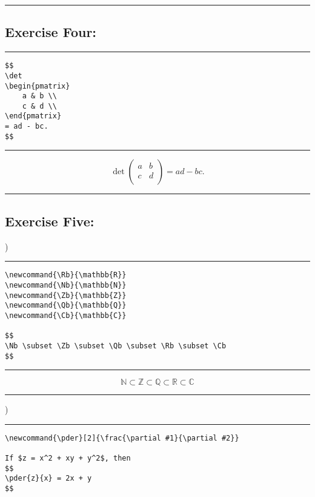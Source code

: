 \documentclass{article} %
\newcommand{\linediv}{\noindent\rule{6.5in}{2pt}}
\newcommand{\linedivm}{\noindent\rule{6.5in}{1pt}}
\begin{document}
\linediv

\subsection*{Exercise Four:}

\linediv

\begin{verbatim}
$$
\det
\begin{pmatrix}
    a & b \\
    c & d \\
\end{pmatrix}
= ad - bc.
$$
\end{verbatim}

\linedivm

$$
\det
\begin{pmatrix}
    a & b \\
    c & d \\
\end{pmatrix}
= ad - bc.
$$

\linediv

\subsection*{Exercise Five:}

)

\linediv

\begin{verbatim}
\newcommand{\Rb}{\mathbb{R}}
\newcommand{\Nb}{\mathbb{N}}
\newcommand{\Zb}{\mathbb{Z}}
\newcommand{\Qb}{\mathbb{Q}}
\newcommand{\Cb}{\mathbb{C}}

$$
\Nb \subset \Zb \subset \Qb \subset \Rb \subset \Cb
$$
\end{verbatim}

\linedivm

\newcommand{\Rb}{\mathbb{R}}
\newcommand{\Nb}{\mathbb{N}}
\newcommand{\Zb}{\mathbb{Z}}
\newcommand{\Qb}{\mathbb{Q}}
\newcommand{\Cb}{\mathbb{C}}

$$
\Nb \subset \Zb \subset \Qb \subset \Rb \subset \Cb
$$

\linediv

)

\linediv

\begin{verbatim}
\newcommand{\pder}[2]{\frac{\partial #1}{\partial #2}}

If $z = x^2 + xy + y^2$, then
$$
\pder{z}{x} = 2x + y
$$
\end{verbatim}
\end{document}
